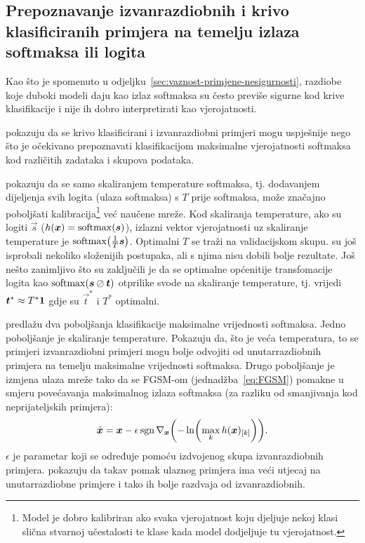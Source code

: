 \documentclass[utf8, diplomski, lmodern]{fer}
\begin{document}
\subsection{Prepoznavanje izvanrazdiobnih i krivo klasificiranih primjera na temelju izlaza softmaksa ili logita} \label{subsec:pristupi-ood-softmaks-logiti}

Kao što je spomenuto u odjeljku~\ref{sec:vaznost-primjene-nesigurnosti}, razdiobe koje duboki modeli daju kao izlaz softmaksa su često previše sigurne kod krive klasifikacije i nije ih dobro interpretirati kao vjerojatnosti.

\cite{Hendrycks:2016:BDMOODE} pokazuju da se krivo klasificirani i izvanrazdiobni primjeri mogu uspješnije nego što je očekivano prepoznavati klasifikacijom maksimalne vjerojatnosti softmaksa kod različitih zadataka i skupova podataka. 

\citet{Guo:2017:CMNN} pokazuju da se samo skaliranjem temperature softmaksa, tj. dodavanjem dijeljenja svih logita (ulaza softmaksa) s $T$ prije softmaksa, može značajno poboljšati kalibracija\footnote{Model je dobro kalibriran ako svaka vjerojatnost koju djeljuje nekoj klasi slična stvarnoj učestalosti te klase kada model dodjeljuje tu vjerojatnost.} već naučene mreže. Kod skaliranja temperature, ako su logiti $\vec s$ ($h(\vec x)=\softmax(\vec s)$), izlazni vektor vjerojatnosti uz skaliranje temperature je $\softmax\del{\frac{1}{T}\vec s}$. Optimalni $T$ se traži na validacijskom skupu. \citet{Guo:2017:CMNN} su još isprobali nekoliko složenijih postupaka, ali s njima nisu dobili bolje rezultate. Još nešto zanimljivo što su zaključili je da se optimalne općenitije transfomacije logita kao $\softmax(\vec s\oslash\vec t)$ otprilike svode na skaliranje temperature, tj. vrijedi $\vec t^*\approx T^*\cvec 1$ gdje su $\vec t^*$ i $T^*$ optimalni. 

\cite{Liang:2017:PDOODENN} predlažu dva poboljšanja klasifikacije maksimalne vrijednosti softmaksa. Jedno poboljšanje je skaliranje temperature. Pokazuju da, što je veća temperatura, to se primjeri izvanrazdiobni primjeri mogu bolje odvojiti od unutarrazdiobnih primjera na temelju maksimalne vrijednosti softmaksa. Drugo poboljšanje je izmjena ulaza mreže tako da se FGSM-om (jednadžba~\eqref{eq:FGSM}) pomakne u smjeru povećavanja maksimalnog izlaza softmaksa (za razliku od smanjivanja kod neprijateljskih primjera):
\begin{equation} \label{eq:ODIN-FGSM}
\tilde{\vec x} = \vec x - \epsilon\sgn\nabla_{\vec x}\del{-\ln \del{\max_k h(\vec x)_\ind{k}}} \text{.}
\end{equation}
$\epsilon$ je parametar koji se određuje pomoću izdvojenog skupa izvanrazdiobnih primjera. \cite{Liang:2017:PDOODENN} pokazuju da takav pomak ulaznog primjera ima veći utjecaj na unutarrazdiobne primjere i tako ih bolje razdvaja od izvanrazdiobnih.
\end{document}
